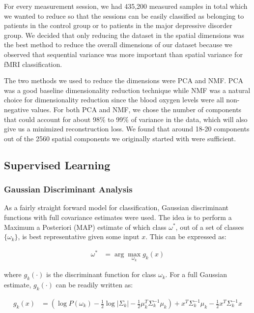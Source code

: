 \documentclass{article}[12pt]
\begin{document}
   For every measurement session, we had 435,200 measured samples in total which we wanted to reduce so that the sessions can be easily classified as belonging to patients in the control group or to patients in the major depressive disorder group. We decided that only reducing the dataset in the spatial dimensions was the best method to reduce the overall dimensions of our dataset because we observed that sequential variance was more important than spatial variance for fMRI classification. 
   
   The two methods we used to reduce the dimensions were PCA and NMF. PCA was a good baseline dimensionality reduction technique while NMF was a natural choice for dimensionality reduction since the blood oxygen levels were all non-negative values. For both PCA and NMF, we chose the number of components that could account for about 98\% to 99\% of variance in the data, which will also give us a minimized reconstruction loss. We found that around 18-20 components out of the 2560 spatial components we originally started with were sufficient. 
   
   \subsection{Supervised Learning}
   \subsubsection{Gaussian Discriminant Analysis}
   As a fairly straight forward model for classification, Gaussian discriminant functions with full covariance estimates were used. The idea is to perform a Maximum a Posteriori (MAP) estimate of which class $\omega^*$, out of a set of classes $\lbrace \omega_k \rbrace$, is best representative given some input $x$. This can be expressed as:
   
   \begin{align*}
   \omega^* &= \arg \max_{\omega_k} g_k(x)
   \end{align*}
   
   where $g_k(\cdot)$ is the discriminant function for class $\omega_k$. For a full Gaussian estimate, $g_k(\cdot)$ can be readily written as:
   
   \begin{align*}
   g_k(x) &= \left( \log P(\omega_k) - \frac{1}{2} \log \left| \Sigma_k \right| - \frac{1}{2} \mu_k^T \Sigma_k^{-1} \mu_k \right) + x^T \Sigma_k^{-1} \mu_k - \frac{1}{2} x^T \Sigma_k^{-1} x 
   \end{align*}
   
\end{document}

